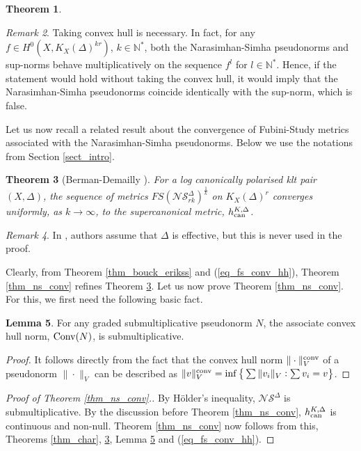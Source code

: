 \documentclass[12pt]{article}
\numberwithin{equation}{section}
\theoremstyle{theorem}
\newtheorem{thm}{Theorem}[section]
\theoremstyle{definition}
\newtheorem{lem}[thm]{Lemma}
\theoremstyle{remark}
\newtheorem{rem}[thm]{Remark}
\newcommand{\conv}{{\rm{conv}}}
\newcommand{\nat}{\mathbb{N}}
\newcommand{\Conv}[1]{{\rm{Conv}}{(#1)}}
\begin{document}
\begin{sloppypar}
\begin{thm}
\begin{equation}
		\end{equation}
	\end{thm}
	\begin{rem}
		Taking convex hull is necessary. In fact, for any $f \in H^0(X, K_X(\Delta)^{kr})$, $k \in \nat^*$, both the Narasimhan-Simha pseudonorms and sup-norms behave multiplicatively on the sequence $f^l$ for $l \in \nat^*$.
		Hence, if the statement would hold without taking the convex hull, it would imply that the Narasimhan-Simha pseudonorms coincide identically with the sup-norm, which is false.
	\end{rem}
	\par 
	Let us now recall a related result about the convergence of Fubini-Study metrics associated with the Narasimhan-Simha pseudonorms.
	Below we use the notations from Section \ref{sect_intro}.
	\end{sloppypar} 
	\begin{thm}[{Berman-Demailly \cite[Proposition 5.19 and Remark 5.23]{BerDem} }]\label{thm_berm_dem}
		For a log canonically polarised klt pair $(X, \Delta)$, the sequence of metrics $FS(\mathcal{NS}_{r k}^{\Delta})^{\frac{1}{k}}$ on $K_X(\Delta)^{r}$ converges uniformly, as $k \to \infty$, to the supercanonical metric, $h^{K, \Delta}_{{\rm{can}}}$.
	\end{thm}
	\begin{rem}
		In \cite{BerDem}, authors assume that $\Delta$ is effective, but this is never used in the proof.
	\end{rem}
	Clearly, from Theorem \ref{thm_bouck_erikss} and (\ref{eq_fs_conv_hh}), Theorem \ref{thm_ns_conv} refines Theorem \ref{thm_berm_dem}.
	Let us now prove Theorem \ref{thm_ns_conv}.
	For this, we first need the following basic fact.
	\begin{lem}\label{lem_conv_subm}
		For any graded submultiplicative pseudonorm $N$, the associate convex hull norm, $\Conv{N}$, is submultiplicative.
	\end{lem}
	\begin{proof}
		It follows directly from the fact that the convex hull norm $\| \cdot \|_V^{\conv}$ of a pseudonorm $\| \cdot \|_V$ can be described as $
			\| v \|_V^{\conv} = \inf \big\{ 
			\sum \| v_i \|_V : \sum v_i = v
			\big\}$.
	\end{proof}
	\begin{sloppypar}
	\begin{proof}[Proof of Theorem \ref{thm_ns_conv}.]
		By Hölder's inequality, $\mathcal{NS}^{\Delta}$ is submultiplicative.
		By the discussion before Theorem \ref{thm_ns_conv}, $h^{K, \Delta}_{{\rm{can}}}$ is continuous and non-null.
		Theorem \ref{thm_ns_conv} now follows from this, Theorems \ref{thm_char}, \ref{thm_berm_dem}, Lemma \ref{lem_conv_subm} and (\ref{eq_fs_conv_hh}).
	\end{proof}
	\end{sloppypar}
	
\end{document}
